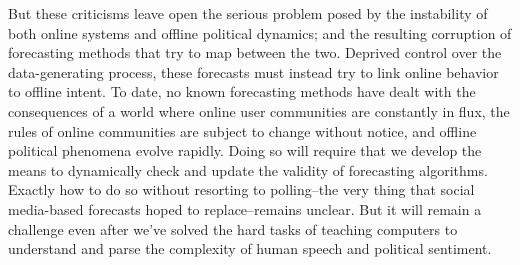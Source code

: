 \documentclass{article}
\begin{document}
But these criticisms leave open the serious problem posed by the
instability of both online systems and offline political dynamics; and
the resulting corruption of forecasting methods that try to map
between the two. Deprived control over the data-generating process,
these forecasts must instead try to link online behavior to offline
intent. To date, no known forecasting methods have dealt with the
consequences of a world where online user communities are constantly
in flux, the rules of online communities are subject to change without
notice, and offline political phenomena evolve rapidly. Doing so will
require that we develop the means to dynamically check and update the
validity of forecasting algorithms. Exactly how to do so without
resorting to polling--the very thing that social media-based forecasts
hoped to replace--remains unclear. But it will remain a challenge even
after we've solved the hard tasks of teaching computers to understand
and parse the complexity of human speech and political sentiment.





\end{document}
